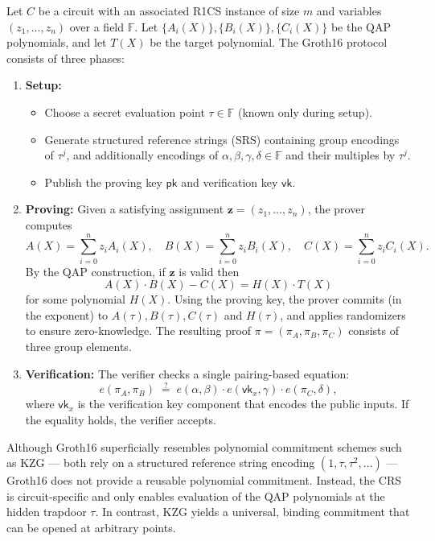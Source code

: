 \begin{protocol}[Groth16]
Let $C$ be a circuit with an associated R1CS instance of size $m$ and variables $(z_1, \dots, z_n)$ over a field $\mathbb{F}$.
Let $\{A_i(X)\}, \{B_i(X)\}, \{C_i(X)\}$ be the QAP polynomials, and let $T(X)$ be the target polynomial.
The Groth16 protocol consists of three phases:

\begin{enumerate}
  \item \textbf{Setup:} 
  \begin{itemize}
    \item Choose a secret evaluation point $\tau \in \mathbb{F}$ (known only during setup).
    \item Generate structured reference strings (SRS) containing group encodings of $\tau^j$, 
    and additionally encodings of $\alpha, \beta, \gamma, \delta \in \mathbb{F}$ and their multiples by $\tau^j$.
    \item Publish the proving key $\mathsf{pk}$ and verification key $\mathsf{vk}$.
  \end{itemize}

  \item \textbf{Proving:}  
  Given a satisfying assignment $\mathbf{z} = (z_1, \dots, z_n)$, the prover computes
  \[
  A(X) = \sum_{i=0}^{n} z_i A_i(X), \quad
  B(X) = \sum_{i=0}^{n} z_i B_i(X), \quad
  C(X) = \sum_{i=0}^{n} z_i C_i(X).
  \]
  By the QAP construction, if $\mathbf{z}$ is valid then
  \[
  A(X) \cdot B(X) - C(X) = H(X) \cdot T(X)
  \]
  for some polynomial $H(X)$.
  Using the proving key, the prover commits (in the exponent) to $A(\tau), B(\tau), C(\tau)$ and $H(\tau)$,
  and applies randomizers to ensure zero-knowledge.
  The resulting proof $\pi = (\pi_A, \pi_B, \pi_C)$ consists of three group elements.

  \item \textbf{Verification:}  
  The verifier checks a single pairing-based equation:
  \[
  e(\pi_A, \pi_B) \;\stackrel{?}{=}\;
  e(\alpha, \beta) \cdot e(\mathsf{vk}_x, \gamma) \cdot e(\pi_C, \delta),
  \]
  where $\mathsf{vk}_x$ is the verification key component that encodes the public inputs.
  If the equality holds, the verifier accepts.
\end{enumerate}
\end{protocol}

\myspace

\begin{remark}
Although Groth16 superficially resembles polynomial commitment schemes such as KZG
— both rely on a structured reference string encoding $(1,\tau,\tau^2,\dots)$ —
Groth16 does not provide a reusable polynomial commitment.
Instead, the CRS is circuit-specific and only enables evaluation of the QAP polynomials
at the hidden trapdoor $\tau$.  
In contrast, KZG yields a universal, binding commitment that can be opened at arbitrary points.
\end{remark}

